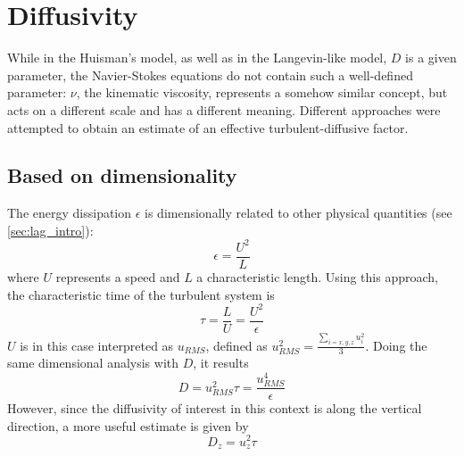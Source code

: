 \section{Diffusivity}

While in the Huisman's model, as well as in the Langevin-like model, $D$ is a given parameter, the Navier-Stokes equations do not contain such a well-defined parameter: $\nu$, the kinematic viscosity, represents a somehow similar concept, but acts on a different scale and has a different meaning. Different approaches were attempted to obtain an estimate of an effective turbulent-diffusive factor.

\subsection{Based on dimensionality} \label{sec:diff_dimens}
The energy dissipation $\epsilon$ is dimensionally related to other physical quantities (see \autoref{sec:lag_intro}):
\[ \epsilon = \frac{U^2}{L} \]
where $U$ represents a speed and $L$ a characteristic length. Using this approach, the characteristic time of the turbulent system is
\[ \tau = \frac{L}{U} = \frac{U^2}{\epsilon} \]
$U$ is in this case interpreted as $u_{RMS}$, defined as \( u_{RMS}^2 = \frac{ \sum_{i={x,y,z}} u_i^2 }{3} \).
Doing the same dimensional analysis with $D$, it results
\[ D = u_{RMS}^2 \tau = \frac{u_{RMS}^4}{\epsilon} \]
However, since the diffusivity of interest in this context is along the vertical direction, a more useful estimate is given by
\[ D_z = u_z^2 \tau \]



